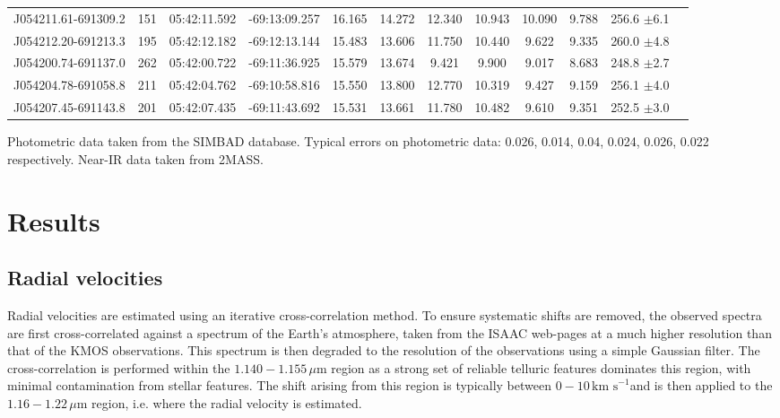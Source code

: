 \documentclass[useAMS,usenatbib]{mn2e}
\def\kms{$\mbox{km s}^{-1}$}
\begin{document}
\begin{table}
\begin{center}
\begin{tabular}{lrcccccccccl}
J054211.61-691309.2 & 151 & 05:42:11.592 & -69:13:09.257 & 16.165 & 14.272 & 12.340 & 10.943 & 10.090 & 9.788 &  256.6 $\pm$6.1\\
J054212.20-691213.3 & 195 & 05:42:12.182 & -69:12:13.144 & 15.483 & 13.606 & 11.750 & 10.440 &  9.622 & 9.335 &  260.0 $\pm$4.8\\
J054200.74-691137.0 & 262 & 05:42:00.722 & -69:11:36.925 & 15.579 & 13.674 &  9.421 &  9.900 &  9.017 & 8.683 &  248.8 $\pm$2.7\\
J054204.78-691058.8 & 211 & 05:42:04.762 & -69:10:58.816 & 15.550 & 13.800 & 12.770 & 10.319 &  9.427 & 9.159 &  256.1 $\pm$4.0\\
J054207.45-691143.8 & 201 & 05:42:07.435 & -69:11:43.692 & 15.531 & 13.661 & 11.780 & 10.482 &  9.610 & 9.351 &  252.5 $\pm$3.0\\



\hline
\end{tabular}
\end{center}
{Photometric data taken from the SIMBAD database. Typical errors on photometric data:
0.026, 0.014, 0.04, 0.024, 0.026, 0.022 respectively.
Near-IR data taken from 2MASS.}
\end{table}


\section{Results} %
\label{sec:results}


\subsection{Radial velocities} %
\label{sub:radial_velocities}
Radial velocities are estimated using an iterative cross-correlation method.
To ensure systematic shifts are removed, the observed spectra are first cross-correlated against a spectrum of the Earth's atmosphere, taken from the ISAAC web-pages at a much higher resolution than that of the KMOS observations.
This spectrum is then degraded to the resolution of the observations using a simple Gaussian filter.
The cross-correlation is performed within the $1.140-1.155\,\mu$m region as a strong set of reliable telluric features dominates this region, with minimal contamination from stellar features.
The shift arising from this region is typically between $0-10\,$\kms and is then applied to the $1.16-1.22\,\mu$m region, i.e. where the radial velocity is estimated.
\end{document}
